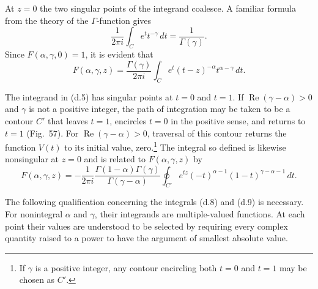 At $z=0$ the two singular points of the integrand coalesce. A familiar formula
from the theory of the $\Gamma$-function gives
\begin{equation}
 \frac1{2\pi i}\int_C e^tt^{-\gamma}\,dt=\frac1{\Gamma(\gamma)}.
 \tag{d.7}
\end{equation}
Since $F(\alpha,\gamma,0)=1$, it is evident that
\begin{equation}
 F(\alpha,\gamma,z)=\frac{\Gamma(\gamma)}{2\pi i}
 \int_Ce^t(t-z)^{-\alpha}t^{\alpha-\gamma}\,dt.
 \tag{d.8}
\end{equation}

The integrand in (d.5) has singular points at $t=0$ and $t=1$. If
$\operatorname{Re}(\gamma-\alpha)>0$ and $\gamma$ is not a positive integer,
the path of integration may be taken to be a contour $C'$ that leaves $t=1$,
encircles $t=0$ in the positive sense, and returns to $t=1$ (Fig.~57). For
$\operatorname{Re}(\gamma-\alpha)>0$, traversal of this contour returns the
function $V(t)$ to its initial value, zero.\footnote{If $\gamma$ is a positive
integer, any contour encircling both $t=0$ and $t=1$ may be chosen as $C'$.}
The integral so defined is likewise nonsingular at $z=0$ and is related to
$F(\alpha,\gamma,z)$ by
\begin{equation}
 F(\alpha,\gamma,z)=-\frac1{2\pi i}
 \frac{\Gamma(1-\alpha)\Gamma(\gamma)}{\Gamma(\gamma-\alpha)}
 \oint_{C'}e^{tz}(-t)^{\alpha-1}(1-t)^{\gamma-\alpha-1}\,dt.
 \tag{d.9}
\end{equation}

\begin{figure}[ht]
\centering
{}
\caption{ }\label{fig:57}
\end{figure}

The following qualification concerning the integrals (d.8) and (d.9) is
necessary. For nonintegral $\alpha$ and $\gamma$, their integrands are
multiple-valued functions. At each point their values are understood to be
selected by requiring every complex quantity raised to a power to have the
argument of smallest absolute value.

